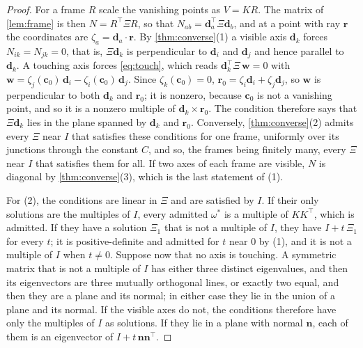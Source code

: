 \documentclass[pdflatex,sn-mathphys-num,iicol]{sn-jnl}
\newcommand{\vd}{\mathbf{d}}
\newcommand{\vr}{\mathbf{r}}
\newcommand{\vc}{\mathbf{c}}
\theoremstyle{thmstyleone}
\theoremstyle{thmstylethree}
\theoremstyle{thmstyletwo}
\begin{document}
\begin{proof}
For a frame $R$ scale the vanishing points as $V=KR$. The matrix of \cref{lem:frame} is then $N=R^{\top}\Xi R$, so that $N_{ab}=\vd_a^{\top}\Xi\vd_b$, and at a point with ray $\vr$ the coordinates are $\zeta_a=\vd_a\cdot\vr$. By \cref{thm:converse}(1) a visible axis $\vd_k$ forces $N_{ik}=N_{jk}=0$, that is, $\Xi\vd_k$ is perpendicular to $\vd_i$ and $\vd_j$ and hence parallel to $\vd_k$. A touching axis forces \eqref{eq:touch}, which reads $\vd_k^{\top}\Xi\,\mathbf w=0$ with $\mathbf w=\zeta_j(\vc_0)\,\vd_i-\zeta_i(\vc_0)\,\vd_j$. Since $\zeta_k(\vc_0)=0$, $\vr_0=\zeta_i\vd_i+\zeta_j\vd_j$, so $\mathbf w$ is perpendicular to both $\vd_k$ and $\vr_0$; it is nonzero, because $\vc_0$ is not a vanishing point, and so it is a nonzero multiple of $\vd_k\times\vr_0$. The condition therefore says that $\Xi\vd_k$ lies in the plane spanned by $\vd_k$ and $\vr_0$. Conversely, \cref{thm:converse}(2) admits every $\Xi$ near $I$ that satisfies these conditions for one frame, uniformly over its junctions through the constant $C$, and so, the frames being finitely many, every $\Xi$ near $I$ that satisfies them for all. If two axes of each frame are visible, $N$ is diagonal by \cref{thm:converse}(3), which is the last statement of (1).

For (2), the conditions are linear in $\Xi$ and are satisfied by $I$. If their only solutions are the multiples of $I$, every admitted $\omega^{*}$ is a multiple of $KK^{\top}$, which is admitted. If they have a solution $\Xi_1$ that is not a multiple of $I$, they have $I+t\,\Xi_1$ for every $t$; it is positive-definite and admitted for $t$ near $0$ by (1), and it is not a multiple of $I$ when $t\neq0$. Suppose now that no axis is touching. A symmetric matrix that is not a multiple of $I$ has either three distinct eigenvalues, and then its eigenvectors are three mutually orthogonal lines, or exactly two equal, and then they are a plane and its normal; in either case they lie in the union of a plane and its normal. If the visible axes do not, the conditions therefore have only the multiples of $I$ as solutions. If they lie in a plane with normal $\mathbf n$, each of them is an eigenvector of $I+t\,\mathbf n\mathbf n^{\top}$.
\end{proof}
\end{document}
